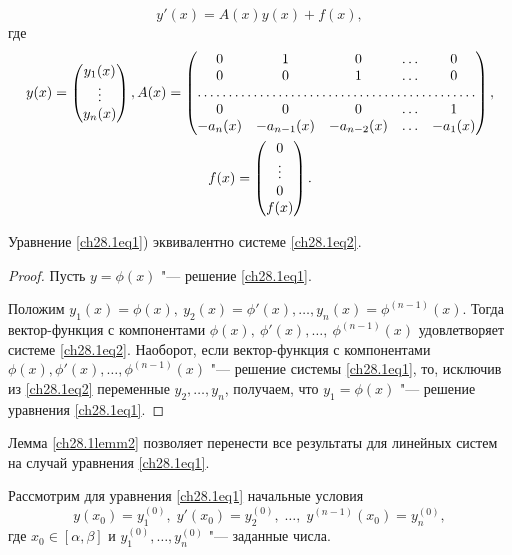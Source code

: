 \begin{equation} \label{ch28.1eq2}
y'(x) = A(x)y(x) + f(x),
\end{equation}
где
\begin{multline}
y(x) = \begin{pmatrix}
y_1(x) \\
\vdots \\
y_n(x)
\end{pmatrix},
A(x) = \begin{pmatrix}
0 & 1 & 0 & \ldots & 0 \\
0 & 0 & 1 & \ldots & 0 \\
\hdotsfor{5} \\
0 & 0 & 0 & \ldots & 1 \\
-a_n(x) & -a_{n - 1}(x) & -a_{n - 2}(x) & \ldots & -a_1(x)
\end{pmatrix}, \\
f(x) = \begin{pmatrix}
0 \\
\vdots \\ 
0 \\
f(x)
\end{pmatrix}.
\end{multline}

\begin{lemm} \label{ch28.1lemm2}
Уравнение \eqref{ch28.1eq1}) эквивалентно системе \eqref{ch28.1eq2}.
\end{lemm}

\begin{proof}
Пусть $y = \phi(x)$ "--- решение \eqref{ch28.1eq1}. 

Положим $y_1(x) = \phi(x), \ y_2(x) = \phi'(x), \ldots, y_n(x) = \phi^{(n - 1)}(x)$. Тогда вектор-функция с компонентами $\phi(x),\ \phi'(x),\ldots,\ \phi^{(n - 1)}(x)$ удовлетворяет системе \eqref{ch28.1eq2}. Наоборот, если вектор-функция с компонентами $\phi(x), \phi'(x), \ldots, \phi^{(n - 1)}(x)$ "--- решение системы \eqref{ch28.1eq1}, то, исключив из \eqref{ch28.1eq2} переменные $y_2, \ldots, y_n$, получаем, что $y_1 = \phi(x)$ "--- решение уравнения \eqref{ch28.1eq1}.
\end{proof}

Лемма \ref{ch28.1lemm2} позволяет  перенести все результаты для линейных систем на случай уравнения \eqref{ch28.1eq1}.

Рассмотрим для уравнения \eqref{ch28.1eq1} начальные условия
\begin{equation} \label{ch28.1eq3}
y(x_0) = y_1^{(0)}, \; y'(x_0) = y_2^{(0)}, \; \ldots, \; y^{(n - 1)}(x_0) = y_n^{(0)},
\end{equation}
где $x_0 \in [\alpha, \beta]$ и $y_1^{(0)}, \ldots, y_n^{(0)}$ "--- заданные числа.


